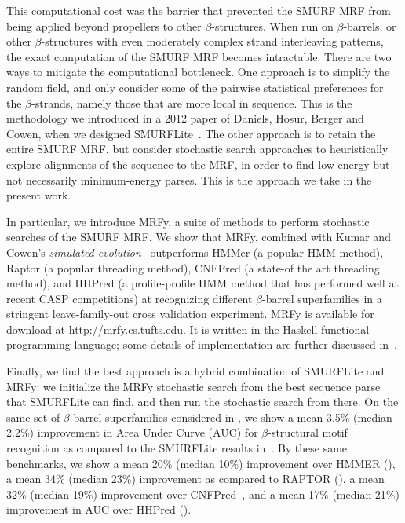\documentclass{acm_proc_article-sp}
\begin{document}
This computational cost was the barrier that prevented the SMURF MRF
from being applied beyond propellers to other $\beta$-structures.
When run on $\beta$-barrels, or other $\beta$-structures with
even moderately complex strand interleaving patterns, the exact
computation of the SMURF MRF becomes intractable. 
There are two ways to mitigate the computational bottleneck. 
One approach is to simplify the random field, and only consider some of the 
pairwise statistical preferences for the $\beta$-strands, namely those that are more local in 
sequence.
This is the methodology we introduced in a 2012 paper of Daniels, Hosur, Berger
and Cowen, when we designed SMURFLite~\cite{Daniels:2012dg}. 
The other approach is to retain the entire SMURF MRF, but consider
stochastic search approaches to heuristically explore alignments of the
sequence to the MRF, in order to find low-energy but not necessarily
minimum-energy parses.
This is the approach we take in the present work.

In particular, we introduce MRFy, a suite of methods to perform
stochastic searches of the SMURF MRF. 
We show that MRFy, combined with Kumar and Cowen's 
{\em simulated evolution\/}~\cite{Kumar:2009tp, Kumar:2010wv}
outperforms HMMer (a popular HMM method), Raptor (a popular threading method), 
CNFPred (a state-of the art threading 
method), and HHPred (a profile-profile HMM method that has performed well at 
recent CASP competitions) at recognizing different $\beta$-barrel superfamilies
in a stringent leave-family-out cross validation experiment. 
MRFy is available for download at \url{http://mrfy.cs.tufts.edu}. 
It is written in the Haskell functional programming language; some details of 
implementation are further discussed in~\cite{Daniels:2012cm}.

Finally, we find the best approach is a hybrid combination of
SMURFLite and MRFy: we initialize the MRFy stochastic search from the
best sequence parse that SMURFLite can find, and then run the
stochastic search from there. On the same set of $\beta$-barrel superfamilies 
considered in \cite{Daniels:2012dg}, we show a mean 3.5\% (median 2.2\%) 
improvement in Area Under Curve (AUC) for
$\beta$-structural motif recognition as compared to the SMURFLite results 
in~\cite{Daniels:2012dg}.
By these same benchmarks, we show a mean 20\% (median 10\%) improvement over
HMMER (\cite{Eddy:1998ut}), a mean 34\% (median
23\%) improvement as compared to RAPTOR (\cite{Xu:2003p3417}),
a mean 32\% (median 19\%) improvement over CNFPred~\cite{JianzhuMa:2012cp},
and a mean 17\% (median 21\%) improvement in AUC 
over HHPred (\cite{Soding:2005ff}).
\end{document}
